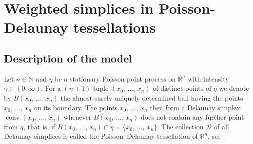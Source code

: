 \documentclass[AHL,Unicode,longabstracts,published]{cedram}
\newcommand{\R}{\mathbb{R}}
\newcommand{\N}{\mathbb{N}}
\newcommand{\dscr}{\mathcal{D}}
\newcommand{\conv}{\mathop{\mathrm{conv}}\nolimits}
\begin{document}
\section{Weighted simplices in Poisson-Delaunay tessellations}\label{sec:Del}

\subsection{Description of the model}

Let $n\in\N$ and $\eta$ be a stationary Poisson point process on $\R^n$ with intensity $\gamma\in(0,\infty)$. For a $(n+1)$-tuple $(x_0,\,\ldots,\,x_n)$ of distinct points of $\eta$ we denote by $B(x_0,\,\ldots,\,x_n)$ the almost surely uniquely determined ball having the points $x_0,\,\ldots,\,x_n$ on its boundary. The points $x_0,\,\ldots,\,x_n$ then form a Delaunay simplex $\conv(x_0,\,\ldots,\,x_n)$ whenever $B(x_0,\,\ldots,\,x_n)$ does not contain any further point from $\eta$, that is, if $B(x_0,\,\ldots,\,x_n)\cap\eta=\{x_0,\,\ldots,\,x_n\}$. The collection $\dscr$ of all Delaunay simplices is called the Poisson--Delaunay tessellation of $\R^n$, see~\cite[Section~10.2]{SW08}.
\end{document}
